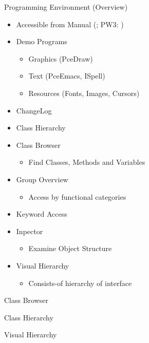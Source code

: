 \begin{sli}{Programming Environment (Overview)}
\begin{itemize}
    \item Accessible from Manual (; PW3: )
    \item Demo Programs
    \begin{itemize}
	\item Graphics (PceDraw)
	\item Text (PceEmacs, ISpell)
	\item Resources (Fonts, Images, Cursors)
    \end{itemize}
    \item ChangeLog
    \item Class Hierarchy
    \item Class Browser
    \begin{itemize}
	\item Find Classes, Methods and Variables    
    \end{itemize}
    \item Group Overview
    \begin{itemize}
	\item Access by functional categories    
    \end{itemize}
    \item Keyword Access
    \item Inpector
    \begin{itemize}
	\item Examine Object Structure    
    \end{itemize}
    \item Visual Hierarchy
    \begin{itemize}
	\item Consists-of hierarchy of interface    
    \end{itemize}
\end{itemize}
\end{sli}

\begin{sli}{Class Browser}
\end{sli}

\begin{sli}{Class Hierarchy}
\end{sli}

\begin{sli}{Visual Hierarchy}
\end{sli}

